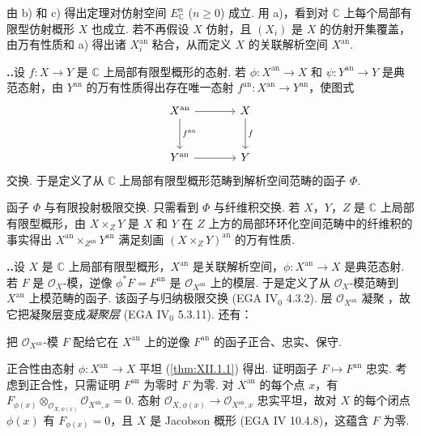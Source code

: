 由 b) 和 c) 得出定理对仿射空间 $E^n_{\mathbb{C}}$ ($n \geqslant 0$) 成立. 用 a)，看到对 $\mathbb{C}$ 上每个局部有限型仿射概形 $X$ 也成立. 若不再假设 $X$ 仿射，且 $(X_i)$ 是 $X$ 的仿射开集覆盖，由万有性质和 a) 得出诸 $X_i^{\mathrm{an}}$ 粘合，从而定义 $X$ 的关联解析空间 $X^{\mathrm{an}}$.

\noindent\textbf{\thesection..}\quad 设 $f \colon X \to Y$ 是 $\mathbb{C}$ 上局部有限型概形的态射. 若 $\phi \colon X^{\mathrm{an}} \to X$ 和 $\psi \colon Y^{\mathrm{an}} \to Y$ 是典范态射，由 $Y^{\mathrm{an}}$ 的万有性质得出存在唯一态射 $f^{\mathrm{an}} \colon X^{\mathrm{an}} \to Y^{\mathrm{an}}$，使图式
\[
\begin{tikzcd}[row sep=large, column sep=large]
X^{\mathrm{an}} \arrow[r] \arrow[d,"{f^{\mathrm{an}}}"] & X \arrow[d,"{f}"] \\
Y^{\mathrm{an}} \arrow[r] & Y
\end{tikzcd}
\]
交换. 于是定义了从 $\mathbb{C}$ 上局部有限型概形范畴到解析空间范畴的函子 $\Phi$.

函子 $\Phi$ 与有限投射极限交换. 只需看到 $\Phi$ 与纤维积交换. 若 $X$，$Y$，$Z$ 是 $\mathbb{C}$ 上局部有限型概形，由 $X \times_Z Y$ 是 $X$ 和 $Y$ 在 $Z$ 上方的局部环环化空间范畴中的纤维积的事实得出 $X^{\mathrm{an}} \times_{Z^{\mathrm{an}}} Y^{\mathrm{an}}$ 满足刻画 $(X \times_Z Y)^{\mathrm{an}}$ 的万有性质.

\noindent\textbf{\thesection..}\quad 设 $X$ 是 $\mathbb{C}$ 上局部有限型概形，$X^{\mathrm{an}}$ 是关联解析空间，$\phi \colon X^{\mathrm{an}} \to X$ 是典范态射. 若 $F$ 是 $\mathcal{O}_X$-模，逆像 $\phi^{*} F = F^{\mathrm{an}}$ 是 $\mathcal{O}_{X^{\mathrm{an}}}$ 上的模层. 于是定义了从 $\mathcal{O}_X$-模范畴到 $X^{\mathrm{an}}$ 上模范畴的函子. 该函子与归纳极限交换 (EGA IV$_0$ 4.3.2). 层 $\mathcal{O}_{X^{\mathrm{an}}}$ 凝聚 \cite[第 18 号 §2 定理 2]{exp12-4}，故它把凝聚层变成\emph{凝聚层} (EGA IV$_0$ 5.3.11). 还有：

\begingroup
\addtocounter{theorem}{-1}
\renewcommand{\thetheorem}{\thesection.3.1}
\begin{proposition}\label{prop:XII.1.3.1}
把 $\mathcal{O}_{X^{\mathrm{an}}}$-模 $F$ 配给它在 $X^{\mathrm{an}}$ 上的逆像 $F^{\mathrm{an}}$ 的函子正合、忠实、保守.
\end{proposition}
\endgroup

正合性由态射 $\phi \colon X^{\mathrm{an}} \to X$ 平坦 (\cref{thm:XII.1.1}) 得出. 证明函子 $F \mapsto F^{\mathrm{an}}$ 忠实. 考虑到正合性，只需证明 $F^{\mathrm{an}}$ 为零时 $F$ 为零. 对 $X^{\mathrm{an}}$ 的每个点 $x$，有 $F_{\phi(x)} \otimes_{\mathcal{O}_{X,\phi(x)}} \mathcal{O}_{X^{\mathrm{an}},x} = 0$. 态射 $\mathcal{O}_{X,\phi(x)} \to \mathcal{O}_{X^{\mathrm{an}},x}$ 忠实平坦，故对 $X$ 的每个闭点 $\phi(x)$ 有 $F_{\phi(x)} = 0$，且 $X$ 是 Jacobson 概形 (EGA IV 10.4.8)，这蕴含 $F$ 为零.

